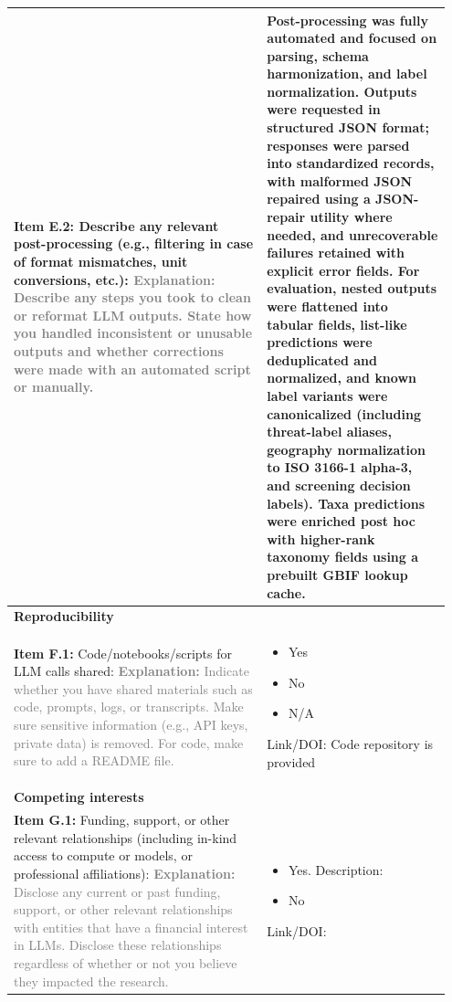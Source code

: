 \documentclass[12pt]{article}
\newcommand{\checked}{\ding{110}}
\newcommand{\unchecked}{\ding{111}}
\begin{document}
\begin{landscape}
{\begin{longtable}{|p{0.55\linewidth}|p{0.40\linewidth}|}
\\
\hline
\textbf{Item E.2:} Describe any relevant post-processing (e.g., filtering in case of format mismatches, unit conversions, etc.): \textcolor{gray}{{\footnotesize \textbf{Explanation:} Describe any steps you took to clean or reformat LLM outputs. State how you handled inconsistent or unusable outputs and whether corrections were made with an automated script or manually.}} & Post-processing was fully automated and focused on parsing, schema harmonization, and label normalization. Outputs were requested in structured JSON format; responses were parsed into standardized records, with malformed JSON repaired using a JSON-repair utility where needed, and unrecoverable failures retained with explicit error fields. For evaluation, nested outputs were flattened into tabular fields, list-like predictions were deduplicated and normalized, and known label variants were canonicalized (including threat-label aliases, geography normalization to ISO 3166-1 alpha-3, and screening decision labels). Taxa predictions were enriched post hoc with higher-rank taxonomy fields using a prebuilt GBIF lookup cache. \\
\hline
\multicolumn{2}{|l|}{\cellcolor{green!20}\textbf{Reproducibility}} \\
\hline
\textbf{Item F.1:} Code/notebooks/scripts for LLM calls shared: \textcolor{gray}{{\footnotesize \textbf{Explanation:} Indicate whether you have shared materials such as code, prompts, logs, or transcripts. Make sure sensitive information (e.g., API keys, private data) is removed. For code, make sure to add a README file.}} & \begin{itemize}[leftmargin=*]\setlength{\itemsep}{0pt}\setlength{\parskip}{0pt} \item[\checked] Yes \item[\unchecked] No \item[\unchecked] N/A \end{itemize} Link/DOI: Code repository is provided \\
\hline
\multicolumn{2}{|l|}{\cellcolor{green!20}\textbf{Competing interests}} \\
\hline
\textbf{Item G.1:} Funding, support, or other relevant relationships (including in-kind access to compute or models, or professional affiliations): \textcolor{gray}{{\footnotesize \textbf{Explanation:} Disclose any current or past funding, support, or other relevant relationships with entities that have a financial interest in LLMs. Disclose these relationships regardless of whether or not you believe they impacted the research.}} & \begin{itemize}[leftmargin=*]\setlength{\itemsep}{0pt}\setlength{\parskip}{0pt} \item[\unchecked] Yes. Description: \item[\checked] No \end{itemize} Link/DOI: \\

\end{longtable}}
\end{landscape}
\end{document}
